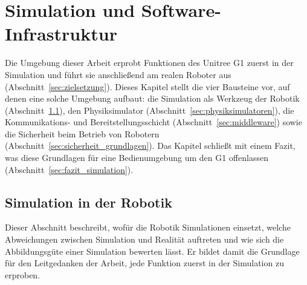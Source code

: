 \chapter{Simulation und Software-Infrastruktur}
\label{chap:simulation}
Die Umgebung dieser Arbeit erprobt Funktionen des Unitree G1 zuerst in der Simulation und führt sie anschließend am realen Roboter aus (Abschnitt~\ref{sec:zielsetzung}).
Dieses Kapitel stellt die vier Bausteine vor, auf denen eine solche Umgebung aufbaut: die Simulation als Werkzeug der Robotik (Abschnitt~\ref{sec:sim_robotik}), den Physiksimulator (Abschnitt~\ref{sec:physiksimulatoren}), die Kommunikations- und Bereitstellungsschicht (Abschnitt~\ref{sec:middleware}) sowie die Sicherheit beim Betrieb von Robotern (Abschnitt~\ref{sec:sicherheit_grundlagen}).
Das Kapitel schließt mit einem Fazit, was diese Grundlagen für eine Bedienumgebung um den G1 offenlassen (Abschnitt~\ref{sec:fazit_simulation}).

\section{Simulation in der Robotik}
\label{sec:sim_robotik}
Dieser Abschnitt beschreibt, wofür die Robotik Simulationen einsetzt, welche Abweichungen zwischen Simulation und Realität auftreten und wie sich die Abbildungsgüte einer Simulation bewerten lässt.
Er bildet damit die Grundlage für den Leitgedanken der Arbeit, jede Funktion zuerst in der Simulation zu erproben.

